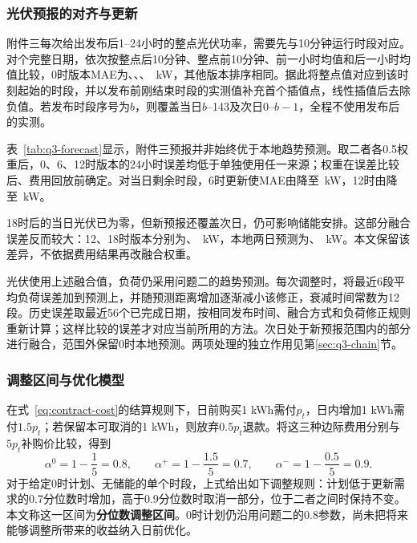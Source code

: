 

\subsubsection{光伏预报的对齐与更新}

附件三每次给出发布后1--24小时的整点光伏功率，需要先与10分钟运行时段对应。对\QThreeAlignDays 个完整日期，依次按整点后10分钟、整点前10分钟、前一小时均值和后一小时均值比较，0时版本MAE为\QThreeAlignStart、\QThreeAlignEnd、\QThreeAlignPrevMean、\QThreeAlignNextMean\ kW，其他版本排序相同。据此将整点值对应到该时刻起始的时段，并以发布前刚结束时段的实测值补充首个插值点，线性插值后去除负值。若发布时段序号为$b$，则覆盖当日$b$--143及次日0--$b-1$，全程不使用发布后的实测。

表~\ref{tab:q3-forecast}显示，附件三预报并非始终优于本地趋势预测。取二者各0.5权重后，0、6、12时版本的24小时误差均低于单独使用任一来源；权重在误差比较后、费用回放前确定。对当日剩余时段，6时更新使MAE由\QThreeStaleMAESix 降至\QThreeFreshMAESix\ kW，12时由\QThreeStaleMAETwelve 降至\QThreeFreshMAETwelve\ kW。\par 18时后的当日光伏已为零，但新预报还覆盖次日，仍可影响储能安排。这部分融合误差反而较大：12、18时版本分别为\QThreeNextAwareTwelve、\QThreeNextAwareEighteen\ kW，本地两日预测为\QThreeNextLocalTwelve、\QThreeNextLocalEighteen\ kW。本文保留该差异，不依据费用结果再改融合权重。



光伏使用上述融合值，负荷仍采用问题二的趋势预测。每次调整时，将最近6段平均负荷误差加到预测上，并随预测距离增加逐渐减小该修正，衰减时间常数为12段。历史误差取最近56个已完成日期，按相同发布时间、融合方式和负荷修正规则重新计算；这样比较的误差才对应当前所用的方法。次日处于新预报范围内的部分进行融合，范围外保留0时本地预测。两项处理的独立作用见第\ref{sec:q3-chain}节。

\subsubsection{调整区间与优化模型}

在式~\eqref{eq:contract-cost}的结算规则下，日前购买1 kWh需付$p_t$，日内增加1 kWh需付$1.5p_t$；若保留本可取消的1 kWh，则放弃$0.5p_t$退款。将这三种边际费用分别与$5p_t$补购价比较，得到
\begin{equation}
  \alpha^{0}=1-\frac{1}{5}=0.8,\qquad
  \alpha^{+}=1-\frac{1.5}{5}=0.7,\qquad
  \alpha^{-}=1-\frac{0.5}{5}=0.9.
  \label{eq:q3-band}
\end{equation}
对于给定0时计划、无储能的单个时段，上式给出如下调整规则：计划低于更新需求的0.7分位数时增加，高于0.9分位数时取消一部分，位于二者之间时保持不变。本文称这一区间为\textbf{分位数调整区间}。0时计划仍沿用问题二的0.8参数，尚未把将来能够调整所带来的收益纳入日前优化。

